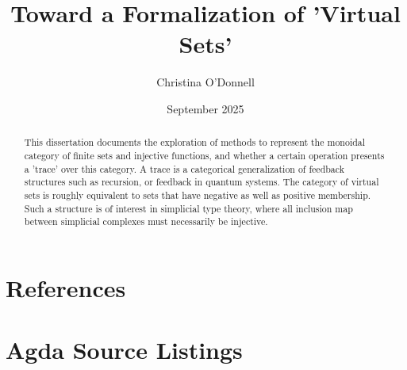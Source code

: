 \documentclass[4pt,a4paper]{report}
\title{Toward a Formalization of 'Virtual Sets'}
\author{Christina O'Donnell}
\date{September 2025}
\begin{document}
\maketitle
\begin{abstract}
This dissertation documents the exploration of methods to represent
the monoidal category of finite sets and injective functions, and whether a
certain operation presents a 'trace' over this category. A trace is a
categorical generalization of feedback structures such as recursion,
or feedback in quantum systems. The category of virtual sets is
roughly equivalent to sets that have negative as well as positive
membership. Such a structure is of interest in simplicial type theory,
where all inclusion map between simplicial complexes must necessarily
be injective.
\end{abstract}
\tableofcontents
\listoffigures
\listoftables






\appendix
\chapter{References}


\chapter{Agda Source Listings}
\end{document}
